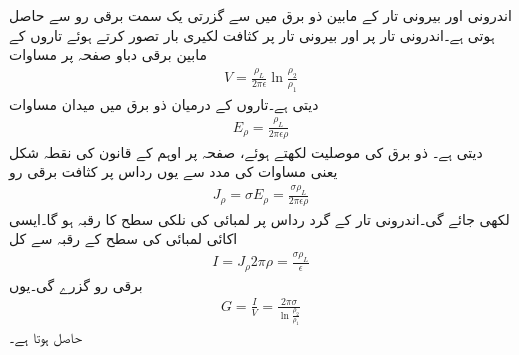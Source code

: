 اندرونی اور بیرونی تار کے مابین ذو برق میں سے گزرتی یک سمت برقی رو  سے حاصل ہوتی ہے۔اندرونی تار پر  اور بیرونی تار پر  کثافت لکیری بار تصور کرتے ہوئے تاروں کے مابین برقی دباو صفحہ  پر مساوات 
\begin{align*}
V=\frac{\rho_L}{2\pi \epsilon} \ln \frac{\rho_2}{\rho_1}
\end{align*}
دیتی ہے۔تاروں کے درمیان ذو برق میں میدان مساوات 
\begin{align*}
E_{\rho}=\frac{\rho_L}{2\pi \epsilon \rho}
\end{align*}
دیتی ہے۔ ذو برق کی موصلیت  لکھتے ہوئے، صفحہ  پر اوہم کے قانون کی نقطہ شکل یعنی مساوات  کی مدد سے یوں رداس  پر کثافت  برقی رو
\begin{align*}
J_{\rho}=\sigma E_{\rho}=\frac{\sigma \rho_L}{2\pi \epsilon \rho}
\end{align*}
لکھی جائے گی۔اندرونی تار کے گرد رداس  پر  لمبائی کی نلکی سطح کا رقبہ  ہو گا۔ایسی اکائی لمبائی کی سطح کے رقبہ 
  سے کل
\begin{align*}
I= J_{\rho} 2\pi \rho=\frac{\sigma \rho_L}{\epsilon}
\end{align*}
برقی رو گزرے گی۔یوں
\begin{align}
G=\frac{I}{V}=\frac{2\pi \sigma}{\ln \frac{\rho_2}{\rho_1}}
\end{align}
حاصل ہوتا ہے۔

